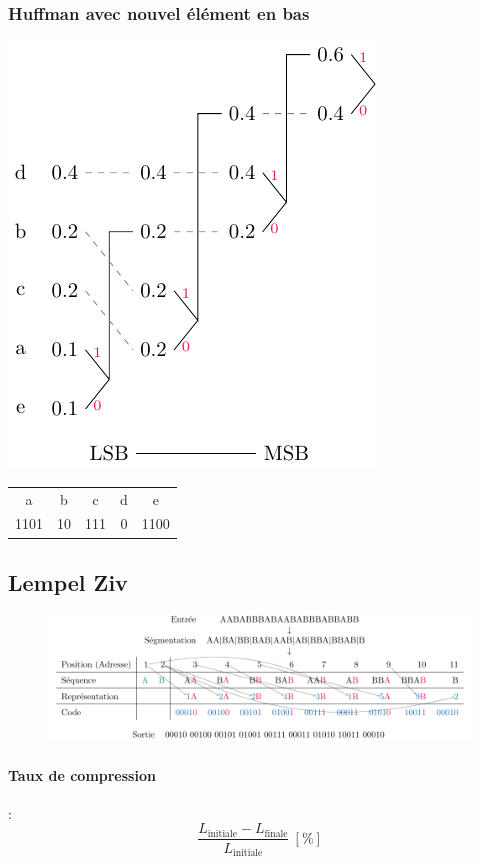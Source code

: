 \documentclass[resume]{subfiles}
\begin{document}
\subsubsection{Huffman avec nouvel élément en bas}
\begin{center}
\includegraphics[scale=0.75,page=2]{drwg_4.pdf}\\
\begin{tabular}{ccccc}
a & b & c & d & e\\
1101 & 10 & 111 & 0 & 1100
\end{tabular}
\end{center}



\subsection{Lempel Ziv}
\begin{figure}[H]
\centering
\includegraphics[width=\columnwidth]{drwg_0.pdf}
\end{figure}
\paragraph{Taux de compression} :
$$\frac{L_\text{initiale}-L_\text{finale}}{L_\text{initiale}}\ [\si{\percent}]$$
\end{document}
